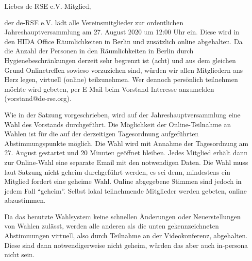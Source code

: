 \documentclass[../Vorlagen/de-RSE_Brief,a4paper]{scrlttr2}
\begin{document}

\begin{letter}{\mbox{}
}
\opening{Liebes de-RSE e.V.-Mitglied,}

der de-RSE e.V. lädt alle Vereinsmitglieder zur ordentlichen Jahreshauptversammlung am 27. August 2020 um 12:00 Uhr ein.
Diese wird in den HIDA Office Räumlichkeiten in Berlin und zusätzlich online abgehalten.
Da die Anzahl der Personen in den Räumlichkeiten in Berlin durch Hygienebeschränkungen derzeit sehr begrenzt ist (acht) und aus dem gleichen Grund Onlinetreffen sowieso vorzuziehen sind, würden wir allen Mitgliedern ans Herz legen, virtuell (online) teilzunehmen.
Wer dennoch persönlich teilnehmen möchte wird gebeten, per E-Mail beim Vorstand Interesse anzumelden (vorstand@de-rse.org).

Wie in der Satzung vorgeschrieben, wird auf der Jahreshauptversammlung eine Wahl des Vorstands durchgeführt.
Die Möglichkeit der Online-Teilnahme an Wahlen ist für die auf der derzeitigen Tagesordnung aufgeführten Abstimmungspunkte möglich.
Die Wahl wird mit Annahme der Tagesordnung am 27. August gestartet und 20 Minuten geöffnet bleiben.
Jedes Mitglied erhält dann zur Online-Wahl eine separate Email mit den notwendigen Daten.
Die Wahl muss laut Satzung nicht geheim durchgeführt werden, es sei denn, mindestens ein Mitglied fordert eine geheime Wahl.
Online abgegebene Stimmen sind jedoch in jedem Fall "`geheim"'.
Selbst lokal teilnehmende Mitglieder werden gebeten, online abzustimmen.

Da das benutzte Wahlsystem keine schnellen Änderungen oder Neuerstellungen von Wahlen zulässt, werden alle anderen als die unten gekennzeichneten Abstimmungen virtuell, also durch Teilnahme an der Videokonferenz, abgehalten.
Diese sind dann notwendigerweise nicht geheim, würden das aber auch in-persona nicht sein.


\end{letter}
\end{document}
